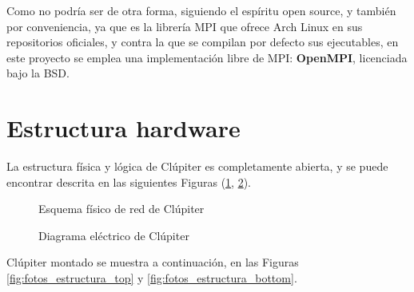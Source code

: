 Como no podría ser de otra forma, siguiendo el espíritu open source, y también por conveniencia, ya que es la librería MPI que ofrece Arch Linux  en
sus repositorios oficiales, y contra la que se compilan por defecto sus ejecutables, en este proyecto se emplea una implementación libre de MPI: \textbf{OpenMPI}, licenciada bajo la BSD. 

\section{Estructura hardware}
La estructura física y lógica de Clúpiter es completamente abierta, y se puede encontrar descrita en las siguientes Figuras (\ref{fig:raspi_diagram_eth}, \ref{fig:raspi_electric_diagram}).

\begin{figure}[h!]
  \centering
  \vspace{0.10cm}
  \caption{Esquema físico de red de Clúpiter}
  \label{fig:raspi_diagram_eth}
\end{figure}

\begin{figure}[h!]
  \centering
  \vspace{0.15cm}
  \def\svgwidth{0.9\textwidth}
  
  \caption{Diagrama eléctrico de Clúpiter}
  \label{fig:raspi_electric_diagram}
  \vspace{0.15cm}
\end{figure}

Clúpiter montado se muestra a continuación, en las Figuras \ref{fig:fotos_estructura_top} y \ref{fig:fotos_estructura_bottom}.

